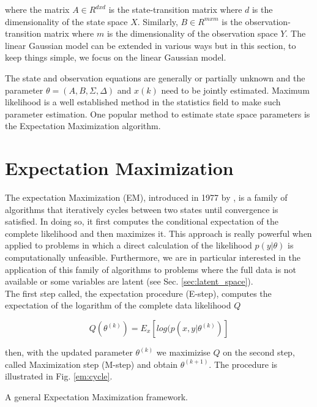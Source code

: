 \documentclass[mscthesis]{usiinfthesis}
\begin{document}
where the matrix $A \in R^{dxd}$ is the state-transition matrix where $d$ is the dimensionality of the state space $X$. Similarly, $B \in R^{mxm}$ is the observation-transition matrix where $m$ is the dimensionality of the observation space $Y$. The linear Gaussian model can be extended in various ways but in this section, to keep things simple, we focus on the linear Gaussian model. 

The state and observation equations are generally or partially unknown and the parameter $\theta=(A, B, \Sigma, \Delta)$ and $x(k)$ need to be jointly estimated. Maximum likelihood is a well established method in the statistics field to make such parameter estimation. One popular method to estimate state space parameters is the Expectation Maximization algorithm.


\section{Expectation Maximization}
\label{sec:em}

The expectation Maximization (EM), introduced in 1977 by \citet{paper:dempster}, is a family of algorithms that iteratively cycles between two states until convergence is satisfied. In doing so, it first computes the conditional expectation of the complete likelihood and then maximizes it. This approach is really powerful when applied to problems in which a direct calculation of the likelihood $p(y|\theta)$ is computationally unfeasible. Furthermore, we are in particular interested in the application of this family of algorithms to problems where the full data is not available or some variables are latent (see Sec. \ref{sec:latent_space}). \\

The first step called, the expectation procedure (E-step), computes the expectation of the logarithm of the complete data likelihood $Q$

\[
Q(\theta^{(k)}) = E_{x} \left[ log(p(x, y | \theta^{(k)}) \right]
\]

then, with the updated parameter $\theta^{(k)}$ we maximizise $Q$ on the second step, called Maximization step (M-step) and obtain $\theta^{(k+1)}$. The procedure is illustrated in Fig. \ref{em:cycle}. 

\begin{algorithm}[h]
  \label{em:cycle}
  \caption{A general Expectation Maximization framework.}
\end{algorithm}
\end{document}
